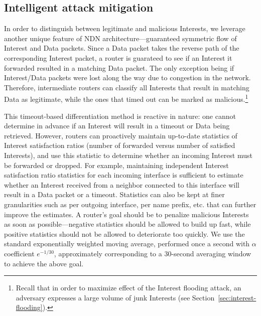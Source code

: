 
\subsection{Intelligent attack mitigation}
\label{sec:intelligent mitigating}


In order to distinguish between legitimate and malicious Interests, we leverage another unique feature of  NDN architecture---guaranteed symmetric flow of Interest and Data packets. Since a Data packet takes the reverse path of the corresponding Interest packet, a router is guarateed to see if an Interest it forwarded resulted in a matching Data packet. The only exception being if Interest/Data packets were lost along the way due to congestion in the network.
Therefore, intermediate routers can classify all Interests that result in matching Data as legitimate, while the ones that timed out can be marked as malicious.\footnote{Recall that in order to maximize effect of the Interest flooding attack, an adversary expresses a large volume of junk Interests (see Section~\ref{sec:interest-flooding}).}  

This timeout-based differentiation method is reactive in nature: one cannot determine in advance if an Interest will result in a timeout or Data being retrieved. However, routers can proactively maintain up-to-date statistics of Interest satisfaction ratios (number of forwarded versus number of satisfied Interests), and use this statistic to determine whether an incoming Interest must be forwarded or dropped. For example, maintaining independent Interest satisfaction ratio statistics for each incoming interface is sufficient to estimate whether an Interest received from a neighbor connected to this interface will result in a Data packet or a timeout. Statistics can also be kept at finer granularities such as per outgoing interface, per name prefix, etc. that can further improve the estimates. A router's goal should be to penalize malicious Interests as soon as possible---negative statistics should be allowed to build up fast, while positive statistics should not be allowed to deteriorate too quickly. We use the standard exponentially weighted moving average, performed once a second with $\alpha$ coefficient $e^{-1/30}$, approximately corresponding to a 30-second averaging window to achieve the above goal.

